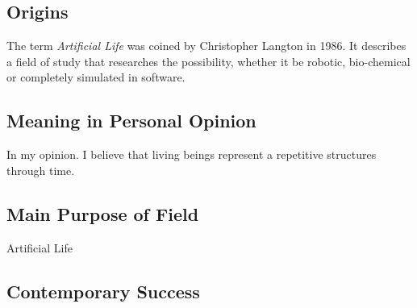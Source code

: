 \documentclass[10pt,a4paper]{article}
\begin{document}
			\subsection{Origins}
		
				The term \textsl{Artificial Life} was coined by Christopher Langton in 1986. It describes a field of study that researches the possibility, whether it be robotic, bio-chemical or completely simulated in software.
		
			\subsection{Meaning in Personal Opinion}
		
				In my opinion. I believe that living beings represent a repetitive structures through time.
		
			\subsection{Main Purpose of Field}
			
				Artificial Life
				
				
			
			\subsection{Contemporary Success}
			
				
					
		\pagebreak
		\printbibliography
\end{document}
